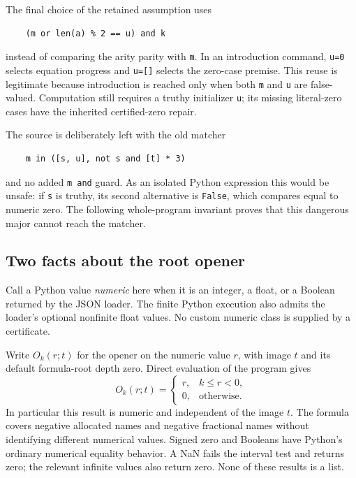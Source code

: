 \documentclass[11pt,letterpaper]{article}
\theoremstyle{definition}\newtheorem{definition}[theorem]{Definition}
\theoremstyle{remark}\newtheorem{remark}[theorem]{Remark}
\begin{document}
The final choice of the retained assumption uses
\begin{verbatim}
    (m or len(a) % 2 == u) and k
\end{verbatim}
instead of comparing the arity parity with \texttt{m}.  In an
introduction command, \texttt{u=0} selects equation progress and
\texttt{u=[]} selects the zero-case premise.  This reuse is legitimate
because introduction is reached only when both \texttt{m} and
\texttt{u} are false-valued.  Computation still requires a truthy
initializer \texttt{u}; its missing literal-zero cases have the
inherited certified-zero repair.

The source is deliberately left with the old matcher
\begin{verbatim}
    m in ([s, u], not s and [t] * 3)
\end{verbatim}
and no added \texttt{m and} guard.  As an isolated Python expression this
would be unsafe: if \texttt{s} is truthy, its second alternative is
\texttt{False}, which compares equal to numeric zero.  The following
whole-program invariant proves that this dangerous major cannot reach
the matcher.

\subsection{Two facts about the root opener}

Call a Python value \emph{numeric} here when it is an integer, a float,
or a Boolean returned by the JSON loader.  The finite Python execution
also admits the loader's optional nonfinite float values.  No custom
numeric class is supplied by a certificate.

Write $O_k(r;t)$ for the opener on the numeric value $r$, with image $t$
and its default formula-root depth zero.  Direct evaluation of the
program gives
\[
 O_k(r;t)=
 \begin{cases}
 r,&k\le r<0,\\
 0,&\text{otherwise}.
 \end{cases}
 \tag{Root scalar}
\]
In particular this result is numeric and independent of the image $t$.
The formula covers negative allocated names and negative fractional
names without identifying different numerical values.  Signed zero and
Booleans have Python's ordinary numerical equality behavior.  A NaN
fails the interval test and returns zero; the relevant infinite values
also return zero.  None of these results is a list.
\end{document}
